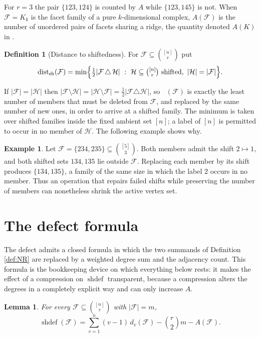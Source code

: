 \documentclass[11pt,reqno]{amsart}
\theoremstyle{plain}
\newtheorem{lemma}[theorem]{Lemma}
\theoremstyle{definition}
\newtheorem{definition}[theorem]{Definition}
\newtheorem{example}[theorem]{Example}
\DeclareMathOperator{\shdef}{shdef}
\DeclareMathOperator{\dsh}{dist_{sh}}
\newcommand{\F}{\mathcal{F}}
\newcommand{\HH}{\mathcal{H}}
\begin{document}
For $r=3$ the pair $\{123,124\}$ is counted by $A$ while $\{123,145\}$ is not. When $\F=K_k$ is the
facet family of a pure $k$-dimensional complex, $A(\F)$ is the number of unordered pairs of facets
sharing a ridge, the quantity denoted $A(K)$ in \cite[Proposition 3.8]{Gupta}.

\begin{definition}[Distance to shiftedness]\label{def:dist}
For $\F\subseteq\binom{[n]}{r}$ put
\[
\dsh(\F)=\min\Bigl\{\tfrac12|\F\,\triangle\,\HH|\ :\
\HH\subseteq\tbinom{[n]}{r}\ \text{shifted},\ |\HH|=|\F|\Bigr\}.
\]
\end{definition}

If $|\F|=|\HH|$ then $|\F\setminus\HH|=|\HH\setminus\F|=\tfrac12|\F\triangle\HH|$, so
$\dsh(\F)$ is exactly the least number of members that must be deleted from $\F$, and replaced by
the same number of new ones, in order to arrive at a shifted family. The minimum is taken over
shifted families inside the fixed ambient set $[n]$; a label of $[n]$ is permitted to occur in no
member of $\HH$. The following example shows why.

\begin{example}\label{ex:vanishing}
Let $\F=\{234,235\}\subseteq\binom{[5]}{3}$. Both members admit the shift $2\mapsto1$, and both
shifted sets $134,135$ lie outside $\F$. Replacing each member by its shift produces
$\{134,135\}$, a family of the same size in which the label $2$ occurs in no member. Thus an
operation that repairs failed shifts while preserving the number of members can nonetheless shrink
the active vertex set.
\end{example}

\section{The defect formula}\label{sec:formula}

The defect admits a closed formula in which the two summands of Definition \ref{def:NR} are replaced
by a weighted degree sum and the adjacency count. This formula is the bookkeeping device on which
everything below rests: it makes the effect of a compression on $\shdef$ transparent, because a
compression alters the degrees in a completely explicit way and can only increase $A$.

\begin{lemma}\label{lem:formula}
For every $\F\subseteq\binom{[n]}{r}$ with $|\F|=m$,
\[
\shdef(\F)=\sum_{v=1}^{n}(v-1)\,d_v(\F)-\binom{r}{2}m-A(\F).
\]
\end{lemma}
\end{document}
